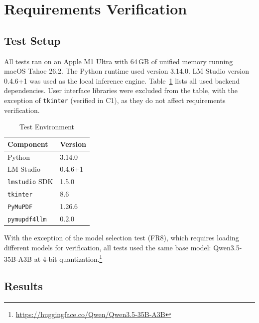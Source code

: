 \section{Requirements Verification}
\label{sec:requirements_verification}

\subsection{Test Setup}
All tests ran on an Apple M1 Ultra with 64\,GB of unified memory running macOS Tahoe 26.2.
The Python runtime used version 3.14.0.
LM Studio version 0.4.6+1 was used as the local inference engine.
Table~\ref{tab:test_env} lists all used backend dependencies. 
User interface libraries were excluded from the table, with the exception of \texttt{tkinter} (verified in C1), as they do not affect requirements verification.

\begin{table}[htbp]
    \centering
    \caption{Test Environment}
    \label{tab:test_env}
    \begin{tabular}{l l}
        \toprule
        \textbf{Component} & \textbf{Version} \\
        \midrule
        Python & 3.14.0 \\
        LM Studio & 0.4.6+1 \\
        \texttt{lmstudio} SDK & 1.5.0 \\
        \texttt{tkinter} & 8.6 \\
        \texttt{PyMuPDF} & 1.26.6 \\
        \texttt{pymupdf4llm} & 0.2.0 \\
        \bottomrule
    \end{tabular}
\end{table}

With the exception of the model selection test (FR8), which requires loading different models for verification, all tests used the same base model: Qwen3.5-35B-A3B at 4-bit quantization.\footnote{\url{https://huggingface.co/Qwen/Qwen3.5-35B-A3B}}

\subsection{Results}

